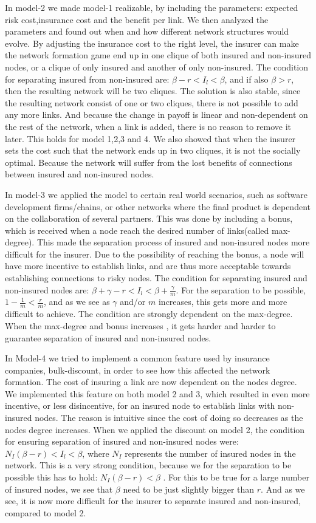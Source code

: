  In model-2 we made model-1 realizable, by including the parameters: expected risk cost,insurance cost and the benefit per link. We then analyzed the parameters and found out when and how different network structures would evolve. By adjusting the insurance cost to the right level, the insurer can make the network formation game end up in one clique of both insured and non-insured nodes, or a clique of only insured and another of only non-insured. The condition for separating insured from non-insured are: $\beta-r<I_{l}<\beta$, and if also $\beta>r$, then the resulting network will be two cliques. The solution is also stable, since the resulting network consist of one or two cliques, there is not possible to add any more links. And because the change in payoff is linear and non-dependent on the rest of the network,   when a link is added, there is no reason to remove it later. This holds for model 1,2,3 and 4.
We also showed that when the insurer sets the cost such that the network ends up in two cliques, it is not the socially optimal. Because the network will suffer from the lost benefits of connections between insured and non-insured nodes.

In model-3 we applied the model to certain real world scenarios, such as software development firms/chains, or other networks where the final product is dependent on the collaboration of several partners.
This was done by including a bonus, which is received when a node reach the desired number of links(called max-degree). This made the separation process of insured and non-insured nodes more difficult for the insurer. Due to the possibility of reaching the bonus, a node will have more incentive to establish links, and are thus more acceptable towards establishing connections to risky nodes. The condition for separating insured and non-insured nodes are: $\beta+\gamma-r<I_{l}<\beta+\frac{\gamma}{m}$. For the separation to be possible, $1-\frac{1}{m}<\frac{r}{m}$, and as we see as $\gamma$ and/or $m$ increases, this gets more and more difficult to achieve. 
The condition are strongly dependent on the max-degree. When the max-degree and bonus increases , it gets harder and harder to guarantee separation of insured and non-insured nodes. 

In Model-4 we tried to implement a common feature used by insurance companies, bulk-discount, in order to see how this affected the network formation. The cost of insuring a link are now dependent on the nodes degree. We implemented this feature on both model 2 and 3, which resulted in even more incentive, or less disincentive, for an insured node to establish links with non-insured nodes. The reason is intuitive since the cost of doing so decreases as the nodes degree increases. 
When we applied the discount on model 2, the condition for ensuring separation of insured and non-insured nodes were: $N_{I}(\beta-r)<I_{l}<\beta$, where $N_{I}$ represents the number of insured nodes in the network. This is a very strong condition, because we for the separation to be possible this has to hold: $N_{I}(\beta-r)<\beta$ . For this to be true for a large number of insured nodes, we see that $\beta$ need to be just slightly bigger than $r$. And as we see, it is now more difficult for the insurer to separate insured and non-insured, compared to model 2.

